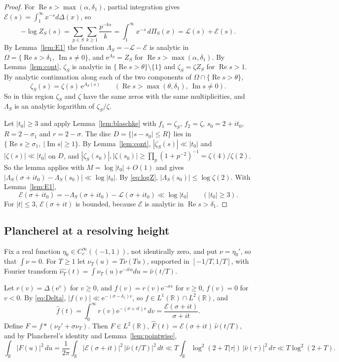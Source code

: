 \documentclass[11pt]{amsart}
\theoremstyle{remark}
\numberwithin{equation}{section}
\newcommand{\R}{\mathbb{R}}
\newcommand{\cL}{\mathcal{L}}
\newcommand{\cE}{\mathcal{E}}
\newcommand{\e}{\mathrm{e}}
\DeclareMathOperator{\re}{Re}
\DeclareMathOperator{\im}{Im}
\begin{document}
\begin{proof}
For $\re s>\max(\alpha,\delta_1)$, partial integration gives $\cE(s)=\int_1^\infty x^{-s}d\Delta(x)$, so
\begin{equation}\label{eq:logZ}
-\log Z_S(s)=\sum_{p\in S}\sum_{k\ge1}\frac{p^{-ks}}{k}=\int_1^\infty x^{-s}\,d\Pi_S(x)=\cL(s)+\cE(s).
\end{equation}
By Lemma~\ref{lem:E1} the function $\Lambda_S=-\cL-\cE$ is analytic in $\Omega=\{\re s>\delta_1,\ \im s\ne0\}$, and $\e^{\Lambda_S}=Z_S$ for $\re s>\max(\alpha,\delta_1)$. By Lemma~\ref{lem:cont}, $\zeta_S$ is analytic in $\{\re s>\theta\}\setminus\{1\}$ and $\zeta_S=\zeta Z_S$ for $\re s>1$. By analytic continuation along each of the two components of $\Omega\cap\{\re s>\theta\}$,
\[
\zeta_S(s)=\zeta(s)\,\e^{\Lambda_S(s)}\qquad(\re s>\max(\theta,\delta_1),\ \im s\ne0).
\]
So in this region $\zeta_S$ and $\zeta$ have the same zeros with the same multiplicities, and $\Lambda_S$ is an analytic logarithm of $\zeta_S/\zeta$.

Let $|t_0|\ge3$ and apply Lemma~\ref{lem:blaschke} with $f_1=\zeta_S$, $f_2=\zeta$, $s_0=2+it_0$, $R=2-\sigma_1$ and $r=2-\sigma$. The disc $D=\{|s-s_0|\le R\}$ lies in $\{\re s\ge\sigma_1,\ |\im s|\ge1\}$. By Lemma~\ref{lem:cont}, $|\zeta_S(s)|\ll|t_0|$ and $|\zeta(s)|\ll|t_0|$ on $D$, and $|\zeta_S(s_0)|,|\zeta(s_0)|\ge\prod_p(1+p^{-2})^{-1}=\zeta(4)/\zeta(2)$. So the lemma applies with $M=\log|t_0|+O(1)$ and gives $|\Lambda_S(\sigma+it_0)-\Lambda_S(s_0)|\ll\log|t_0|$. By \eqref{eq:logZ}, $|\Lambda_S(s_0)|\le\log\zeta(2)$. With Lemma~\ref{lem:E1},
\[
\cE(\sigma+it_0)=-\Lambda_S(\sigma+it_0)-\cL(\sigma+it_0)\ll\log|t_0|\qquad(|t_0|\ge3).
\]
For $|t|\le3$, $\cE(\sigma+it)$ is bounded, because $\cE$ is analytic in $\re s>\delta_1$.
\end{proof}

\subsection{Plancherel at a resolving height}
Fix a real function $\eta_0\in C_c^\infty((-1,1))$, not identically zero, and put $\nu=\eta_0'$, so that $\int\nu=0$. For $T\ge1$ let $\nu_T(u)=T\nu(Tu)$, supported in $[-1/T,1/T]$, with Fourier transform $\widehat{\nu_T}(t)=\int\nu_T(u)\e^{-itu}du=\widehat\nu(t/T)$.

Let $r(v)=\Delta(\e^v)$ for $v\ge0$, and $f(v)=r(v)\e^{-\sigma v}$ for $v\ge0$, $f(v)=0$ for $v<0$. By \eqref{eq:Delta}, $|f(v)|\ll \e^{-(\sigma-\delta_1)v}$, so $f\in L^1(\R)\cap L^2(\R)$, and
\[
\widehat f(t)=\int_0^\infty r(v)\e^{-(\sigma+it)v}\,dv=\frac{\cE(\sigma+it)}{\sigma+it}.
\]
Define $F=f*(\nu_T'+\sigma\nu_T)$. Then $F\in L^2(\R)$, $\widehat F(t)=\cE(\sigma+it)\,\widehat\nu(t/T)$, and by Plancherel's identity and Lemma~\ref{lem:pointwise},
\begin{equation}\label{eq:upperF}
\int_\R|F(u)|^2\,du=\frac1{2\pi}\int_\R|\cE(\sigma+it)|^2\,|\widehat\nu(t/T)|^2\,dt\ll T\int_\R\log^2(2+T|\tau|)\,|\widehat\nu(\tau)|^2\,d\tau\ll T\log^2(2+T).
\end{equation}
\end{document}
